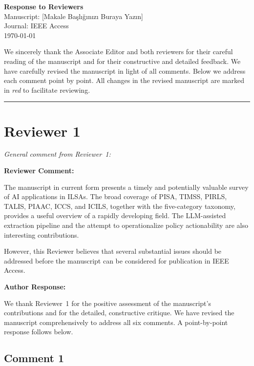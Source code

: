\documentclass[12pt, a4paper]{article}
\newenvironment{reviewercomment}{%
  \begin{mdframed}[linecolor=reviewercolor, linewidth=1.5pt,
    backgroundcolor=reviewercolor!6, innertopmargin=8pt, innerbottommargin=8pt]
  \color{reviewercolor}\textbf{Reviewer Comment:}\normalcolor\par\smallskip
}{%
  \end{mdframed}\medskip
}
\newenvironment{authorresponse}{%
  \begin{mdframed}[linecolor=authorcolor, linewidth=1pt,
    backgroundcolor=authorcolor!5, innertopmargin=8pt, innerbottommargin=8pt]
  \color{authorcolor}\textbf{Author Response:}\normalcolor\par\smallskip
}{%
  \end{mdframed}\bigskip
}
\newcommand{\changed}[1]{\textcolor{changedcolor}{\textit{#1}}}
\begin{document}
\begin{center}
  {\LARGE\bfseries Response to Reviewers}\\[0.8em]
  {\large Manuscript: [Makale Başlığınızı Buraya Yazın]}\\[0.4em]
  {\large Journal: IEEE Access}\\[0.4em]
  \today
\end{center}

\bigskip
\noindent
We sincerely thank the Associate Editor and both reviewers for their careful
reading of the manuscript and for their constructive and detailed feedback.
We have carefully revised the manuscript in light of all comments.
Below we address each comment point by point.
All changes in the revised manuscript are marked in
\changed{red} to facilitate reviewing.

\bigskip
\hrule
\bigskip

\section*{Reviewer 1}

\noindent\textit{General comment from Reviewer~1:}

\begin{reviewercomment}
The manuscript in current form presents a timely and potentially valuable
survey of AI applications in ILSAs. The broad coverage of PISA, TIMSS,
PIRLS, TALIS, PIAAC, ICCS, and ICILS, together with the five-category
taxonomy, provides a useful overview of a rapidly developing field. The
LLM-assisted extraction pipeline and the attempt to operationalize policy
actionability are also interesting contributions.

However, this Reviewer believes that several substantial issues should be
addressed before the manuscript can be considered for publication in IEEE
Access.
\end{reviewercomment}

\begin{authorresponse}
We thank Reviewer~1 for the positive assessment of the manuscript's
contributions and for the detailed, constructive critique. We have revised
the manuscript comprehensively to address all six comments. A point-by-point
response follows below.
\end{authorresponse}

\subsection*{Comment 1}
\end{document}
